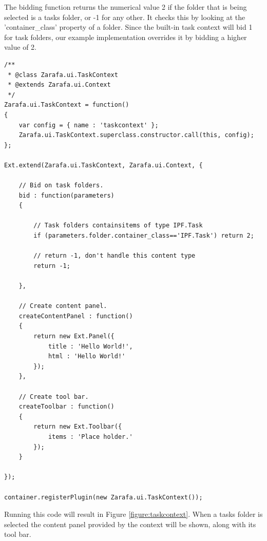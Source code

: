 The bidding function returns the numerical value 2 if the folder that is being selected is a tasks
folder, or -1 for any other. It checks this by looking at the 'container\_class' property of a folder. 
Since the built-in task context will bid 1 for task folders, our example implementation overrides it by 
bidding a higher value of 2. 


\begin{lstlisting}[caption={Boilerplate for a new context.}, label=listing:taskcontext1]
/**
 * @class Zarafa.ui.TaskContext
 * @extends Zarafa.ui.Context
 */
Zarafa.ui.TaskContext = function()
{
	var config = { name : 'taskcontext' };
	Zarafa.ui.TaskContext.superclass.constructor.call(this, config);
};

Ext.extend(Zarafa.ui.TaskContext, Zarafa.ui.Context, {
	
	// Bid on task folders.
	bid : function(parameters)
	{
	
		// Task folders containsitems of type IPF.Task
		if (parameters.folder.container_class=='IPF.Task') return 2;

		// return -1, don't handle this content type
		return -1;
	
	},
	
	// Create content panel.
	createContentPanel : function()
	{
		return new Ext.Panel({
			title : 'Hello World!',
			html : 'Hello World!'
		});
	},
	
	// Create tool bar.
	createToolbar : function()
	{
		return new Ext.Toolbar({
			items : 'Place holder.'
		});
	}	
	
});

container.registerPlugin(new Zarafa.ui.TaskContext());
\end{lstlisting}

Running this code will result in Figure \ref{figure:taskcontext}. When a tasks folder is selected the content
panel provided by the context will be shown, along with its tool bar. 

